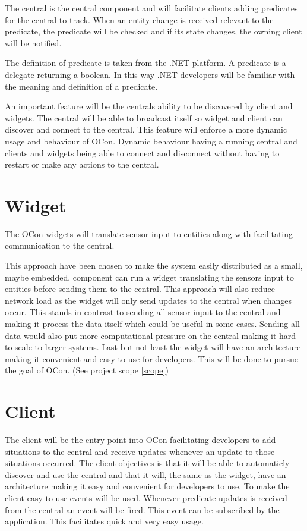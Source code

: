 \documentclass[../report.tex]{subfiles}
\begin{document}
The central is the central component and will facilitate clients adding predicates for the central to track. When an entity change is received relevant to the predicate, the predicate will be checked and if its state changes, the owning client will be notified.

The definition of predicate is taken from the .NET platform. A predicate is a delegate returning a boolean. In this way .NET developers will be familiar with the meaning and definition of a predicate.

An important feature will be the centrals ability to be discovered by client and widgets. The central will be able to broadcast itself so widget and client can discover and connect to the central. This feature will enforce a more dynamic usage and behaviour of OCon. Dynamic behaviour having a running central and clients and widgets being able to connect and disconnect without having to restart or make any actions to the central.
 
\section{Widget}

The OCon widgets will translate sensor input to entities along with facilitating communication to the central.

This approach have been chosen to make the system easily distributed as a small, maybe embedded, component can run a widget translating the sensors input to entities before sending them to the central. This approach will also reduce network load as the widget will only send updates to the central when changes occur. This stands in contrast to sending all sensor input to the central and making it process the data itself which could be useful in some cases. Sending all data would also put more computational pressure on the central making it hard to scale to larger systems. Last but not least the widget will have an architecture making it convenient and easy to use for developers. This will be done to pursue the goal of OCon. (See project scope \ref{scope}) 


\section{Client}

The client will be the entry point into OCon facilitating developers to add situations to the central and receive updates whenever an update to those situations occurred. The client objectives is that it will be able to automaticly discover and use the central and that it will, the same as the widget, have an architecture making it easy and convenient for developers to use. To make the client easy to use events will be used. Whenever predicate updates is received from the central an event will be fired. This event can be subscribed by the application. This facilitates quick and very easy usage.
\end{document}
